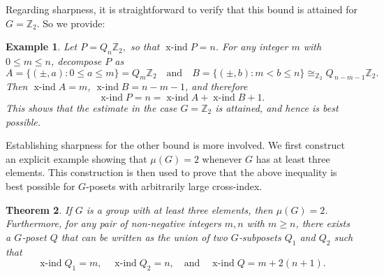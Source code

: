 \documentclass[preprint,12pt]{article}
\renewcommand{\le}{\leqslant}
\renewcommand{\ge}{\geqslant}
\newtheorem{theorem}{Theorem}[section]
\newtheorem{example}[theorem]{Example}
\theoremstyle{definition}
\theoremstyle{remark}
\numberwithin{equation}{section}
\DeclareMathOperator{\xind}{x-ind}
\begin{document}
Regarding sharpness, it is straightforward to verify that this bound is attained for \(G = \mathbb{Z}_2\). So we provide:

\begin{example}
Let
\(
P=Q_n\mathbb{Z}_2,
\)
so that \(\xind P=n\). For any integer \(m\) with \(0\le m\le n\), decompose \(P\) as
\[
A=\{(\pm,a):0\le a\le m\}=Q_m\mathbb{Z}_2
\quad\text{and}\quad
B=\{(\pm,b):m<b\le n\}\cong_{\mathbb{Z}_2} Q_{\,n-m-1}\mathbb{Z}_2.
\]
Then \(\xind A=m\), \(\xind B=n-m-1\), and therefore
\[
\xind P=n=\xind A+\xind B+1.
\]
This shows that the estimate in the case \(G=\mathbb{Z}_2\) is attained, and hence is best possible. 
\end{example}

Establishing sharpness for the other bound is more involved. We first construct an explicit example showing that \(\mu(G) = 2\) whenever \(G\) has at least three elements. This construction is then used to prove that the above inequality is best possible for \(G\)-posets with arbitrarily large cross-index.

\begin{theorem}
\label{Thm: mu(G)=2 & large gap}
If $G$ is a group with at least three elements, then $\mu(G)=2$. Furthermore, for any pair of non‑negative integers $m,n$ with $m \ge n$, there exists a $G$‑poset $Q$ that can be written as the union of two $G$‑subposets $Q_1$ and $Q_2$ such that  
\[
\xind Q_1 = m, \quad \xind Q_2 = n, \quad \text{and} \quad \xind Q = m + 2(n + 1).
\]
\end{theorem}
\end{document}

